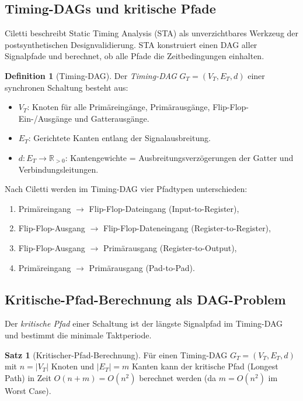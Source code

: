 ﻿\documentclass[a4paper,12pt]{article}
\theoremstyle{definition}
\newtheorem{definition}{Definition}
\newtheorem{satz}{Satz}
\begin{document}
\subsection{Timing-DAGs und kritische Pfade}

Ciletti \cite[Kap.~11, S.~769--780]{ciletti2011} beschreibt Static Timing Analysis
(STA) als unverzichtbares Werkzeug der postsynthetischen Designvalidierung. STA
konstruiert einen DAG aller Signalpfade und berechnet, ob alle Pfade die Zeitbedingungen
einhalten.

\begin{definition}[Timing-DAG]\label{def:timing_dag}
  Der \emph{Timing-DAG} $G_T = (V_T, E_T, d)$ einer synchronen Schaltung besteht aus:
  \begin{itemize}
    \item $V_T$: Knoten für alle Primäreingänge, Primärausgänge, Flip-Flop-Ein-/Ausgänge
          und Gatterausgänge.
    \item $E_T$: Gerichtete Kanten entlang der Signalausbreitung.
    \item $d: E_T \to \mathbb{R}_{>0}$: Kantengewichte = Ausbreitungsverzögerungen der
          Gatter und Verbindungsleitungen.
  \end{itemize}
\end{definition}

Nach Ciletti \cite[S.~770]{ciletti2011} werden im Timing-DAG vier Pfadtypen unterschieden:
\begin{enumerate}
  \item Primäreingang $\to$ Flip-Flop-Dateingang (Input-to-Register),
  \item Flip-Flop-Ausgang $\to$ Flip-Flop-Dateneingang (Register-to-Register),
  \item Flip-Flop-Ausgang $\to$ Primärausgang (Register-to-Output),
  \item Primäreingang $\to$ Primärausgang (Pad-to-Pad).
\end{enumerate}

\subsection{Kritische-Pfad-Berechnung als DAG-Problem}

Der \emph{kritische Pfad} einer Schaltung ist der längste Signalpfad im Timing-DAG und
bestimmt die minimale Taktperiode.

\begin{satz}[Kritischer-Pfad-Berechnung]\label{satz:krit_pfad}
  Für einen Timing-DAG $G_T = (V_T, E_T, d)$ mit $n = |V_T|$ Knoten und $|E_T| = m$
  Kanten kann der kritische Pfad (Longest Path) in Zeit $O(n + m) = O(n^2)$ berechnet
  werden (da $m = O(n^2)$ im Worst Case).
\end{satz}
\end{document}
